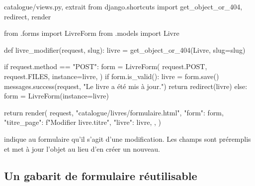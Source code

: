 \begin{codebox}[python]{catalogue/views.py, extrait}
from django.shortcuts import get_object_or_404, redirect, render

from .forms import LivreForm
from .models import Livre


def livre_modifier(request, slug):
    livre = get_object_or_404(Livre, slug=slug)

    if request.method == "POST":
        form = LivreForm(
            request.POST,
            request.FILES,
            instance=livre,
        )
        if form.is_valid():
            livre = form.save()
            messages.success(request, "Le livre a été mis à jour.")
            return redirect(livre)
    else:
        form = LivreForm(instance=livre)

    return render(
        request,
        "catalogue/livres/formulaire.html",
        {
            "form": form,
            "titre_page": f"Modifier {livre.titre}",
            "livre": livre,
        },
    )
\end{codebox}

 indique au formulaire qu'il s'agit d'une modification. Les
champs sont préremplis et  met à jour l'objet au lieu d'en créer un
nouveau.

\subsection{Un gabarit de formulaire réutilisable}


